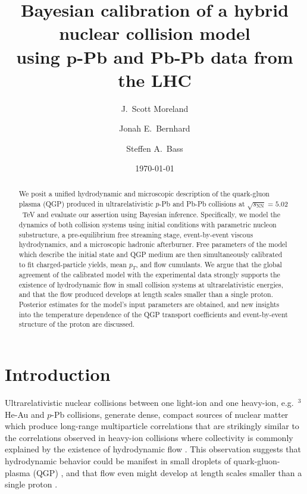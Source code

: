 \documentclass[aps,prc,reprint,amsmath,nofootinbib]{revtex4-1}
\newcommand{\sqrts}{\sqrt{s_\mathrm{NN}}}
\begin{document}
\title{
  Bayesian calibration of a hybrid nuclear collision model\\
  using $\boldsymbol p$-Pb and Pb-Pb data from the LHC
}

\author{J.\ Scott Moreland}
\author{Jonah E.\ Bernhard}
\author{Steffen A.\ Bass}


\date{\today}

\begin{abstract}
We posit a unified hydrodynamic and microscopic description of the quark-gluon plasma (QGP) produced in ultrarelativistic $p$-Pb and Pb-Pb collisions at $\sqrts=5.02$~TeV and evaluate our assertion using Bayesian inference. Specifically, we model the dynamics of both collision systems using initial conditions with parametric nucleon substructure, a pre-equilibrium free streaming stage, event-by-event viscous hydrodynamics, and a microscopic hadronic afterburner.
Free parameters of the model which describe the initial state and QGP medium are then simultaneously calibrated to fit charged-particle yields, mean $p_T$, and flow cumulants.
We argue that the global agreement of the calibrated model with the experimental data strongly supports the existence of hydrodynamic flow in small collision systems at ultrarelativistic energies, and that the flow produced develops at length scales smaller than a single proton.
Posterior estimates for the model's input parameters are obtained, and new insights into the temperature dependence of the QGP transport coefficients and event-by-event structure of the proton are discussed.
\end{abstract}

\maketitle


\section{Introduction}

Ultrarelativistic nuclear collisions between one light-ion and one heavy-ion, e.g.\ $^3$He-Au and $p$-Pb collisions, generate dense, compact sources of nuclear matter which produce long-range multiparticle correlations that are strikingly similar to the correlations observed in heavy-ion collisions where collectivity is commonly explained by the existence of hydrodynamic flow \cite{CMS:2012qk, Abelev:2012ola, Aad:2012gla, Adare:2015ctn}.
This observation suggests that hydrodynamic behavior could be manifest in small droplets of quark-gluon-plasma (QGP) \cite{Bozek:2011if, Bozek:2013uha}, and that flow even might develop at length scales smaller than a single proton \cite{Schenke:2014zha}.
\end{document}
